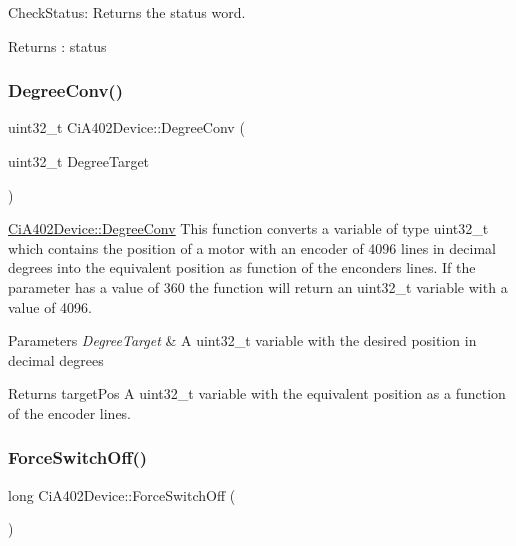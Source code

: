 Check\+Status\+: Returns the status word. 

\begin{DoxyReturn}{Returns}
\+: status 
\end{DoxyReturn}
\mbox{\label{classCiA402Device_a485eaa3cbd186b6f29caf588c7010023}} 
\subsubsection{\texorpdfstring{Degree\+Conv()}{DegreeConv()}}
{\footnotesize\ttfamily uint32\+\_\+t Ci\+A402\+Device\+::\+Degree\+Conv (\begin{DoxyParamCaption}\item[{uint32\+\_\+t}]{Degree\+Target }\end{DoxyParamCaption})}



\hyperlink{classCiA402Device_a485eaa3cbd186b6f29caf588c7010023}{Ci\+A402\+Device\+::\+Degree\+Conv} This function converts a variable of type uint32\+\_\+t which contains the position of a motor with an encoder of 4096 lines in decimal degrees into the equivalent position as function of the enconders lines. If the parameter has a value of 360 the function will return an uint32\+\_\+t variable with a value of 4096. 


\begin{DoxyParams}{Parameters}
{\em Degree\+Target} & A uint32\+\_\+t variable with the desired position in decimal degrees \\
\hline
\end{DoxyParams}
\begin{DoxyReturn}{Returns}
target\+Pos A uint32\+\_\+t variable with the equivalent position as a function of the encoder lines. 
\end{DoxyReturn}
\mbox{\label{classCiA402Device_aff0503b4caa6d2a8e2e66df6b9e0f4e4}} 
\subsubsection{\texorpdfstring{Force\+Switch\+Off()}{ForceSwitchOff()}}
{\footnotesize\ttfamily long Ci\+A402\+Device\+::\+Force\+Switch\+Off (\begin{DoxyParamCaption}{ }\end{DoxyParamCaption})}

